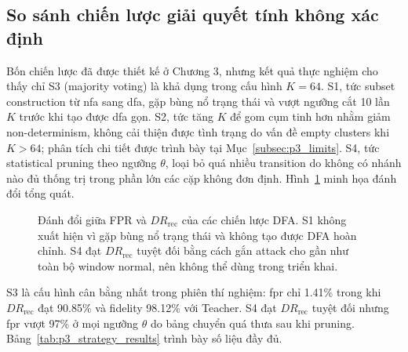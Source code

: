 \documentclass[../main.tex]{subfiles}
\begin{document}
\subsection{So sánh chiến lược giải quyết tính không xác định}
\label{subsec:p3_strategy_results}

Bốn chiến lược đã được thiết kế ở Chương 3, nhưng kết quả thực nghiệm
cho thấy chỉ S3
(majority voting) là khả dụng trong cấu hình $K=64$. S1, tức subset
construction từ
\gls{nfa} sang \gls{dfa}, gặp bùng nổ trạng thái và vượt ngưỡng cắt 10 lần $K$
trước khi tạo được
\gls{dfa} gọn. S2, tức tăng $K$ để gom cụm tinh hơn nhằm giảm
non-determinism, không cải thiện được tình trạng do vấn đề empty
clusters khi $K > 64$; phân tích chi tiết được trình bày tại
Mục~\ref{subsec:p3_limits}. S4, tức statistical pruning theo ngưỡng
$\theta$, loại bỏ quá nhiều transition
do không có nhánh nào đủ thống trị trong phần lớn các cặp không đơn định.
Hình~\ref{fig:p3_fpr_dr} minh họa đánh đổi tổng quát.

\begin{figure}[h!]
  \centering
  \caption{Đánh đổi giữa FPR và $DR_{\text{rec}}$ của các chiến lược DFA. S1
    không xuất hiện vì gặp bùng nổ trạng thái và không tạo được DFA hoàn chỉnh.
    S4 đạt $DR_{\text{rec}}$ tuyệt đối bằng cách gắn attack cho gần như toàn
  bộ window normal, nên không thể dùng trong triển khai.}
  \label{fig:p3_fpr_dr}
\end{figure}

S3 là cấu hình cân bằng nhất trong phiên thí nghiệm: \gls{fpr} chỉ 1.41\%
trong khi $DR_{\text{rec}}$ đạt 90.85\% và fidelity 98.12\% với Teacher.
S4 đạt $DR_{\text{rec}}$ tuyệt đối nhưng \gls{fpr} vượt 97\% ở mọi ngưỡng
$\theta$ do bảng chuyển quá thưa sau khi pruning.
Bảng~\ref{tab:p3_strategy_results} trình bày số liệu đầy đủ.
\end{document}

